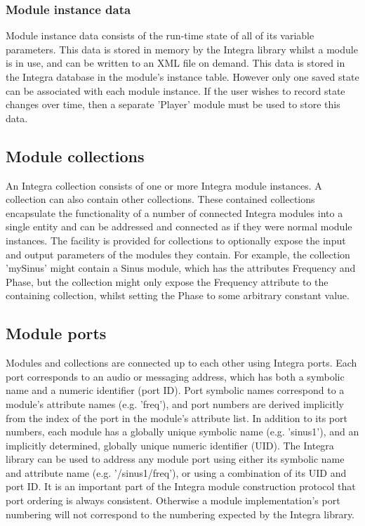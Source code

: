 \subsubsection{Module instance data}\label{subsubsec:module_instance_data} 

Module instance data consists of the run-time state of all of its variable parameters. This data is stored in memory by the Integra library whilst a module is in use, and can be written to an XML file on demand. This data is stored in the Integra database in the module's instance table. However only one saved state can be associated with each module instance. If the user wishes to record state changes over time, then a separate 'Player' module must be used to store this data.

\subsection{Module collections}\label{subsec:module_collections}

An Integra collection consists of one or more Integra module instances. A collection can also contain other collections. These contained collections encapsulate the functionality of a number of connected Integra modules into a single entity and can be addressed and connected as if they were normal module instances. The facility is provided for collections to optionally expose the input and output parameters of the modules they contain. For example, the collection 'mySinus' might contain a Sinus module, which has the attributes Frequency and Phase, but the collection might only expose the Frequency attribute to the containing collection, whilst setting the Phase to some arbitrary constant value.

\subsection{Module ports}\label{subsec:module_ports} 

Modules and collections are connected up to each other using Integra ports. Each port corresponds to an audio or messaging address, which has both a symbolic name and a numeric identifier (port ID). Port symbolic names correspond to a module's attribute names (e.g. 'freq'), and port numbers are derived implicitly from the index of the port in the module's attribute list. In addition to its port numbers, each module has a globally unique symbolic name (e.g. 'sinus1'), and an implicitly determined, globally unique numeric identifier (UID). The Integra library can be used to address any module port using either its symbolic name and attribute name (e.g. '/sinus1/freq'), or using a combination of its UID and port ID. It is an important part of the Integra module construction protocol that port ordering is always consistent. Otherwise a module implementation's port numbering will not correspond to the numbering expected by the Integra library.

